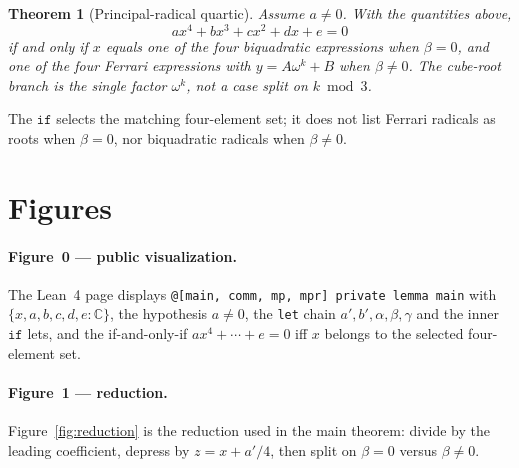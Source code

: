 \documentclass[11pt,a4paper]{article}
\newtheorem{theorem}{Theorem}[section]
\newcommand{\C}{\mathbb{C}}
\begin{document}
\begin{theorem}[Principal-radical quartic]
\label{thm:quartic}
Assume \(a\neq 0\).
With the quantities above,
\[
ax^4+bx^3+cx^2+dx+e=0
\]
if and only if \(x\) equals one of the four biquadratic expressions when \(\beta=0\), and one of the four Ferrari expressions with \(y=A\omega^{k}+B\) when \(\beta\neq 0\).
The cube-root branch is the single factor \(\omega^{k}\), not a case split on \(k\bmod 3\).
\end{theorem}

The \(\mathtt{if}\) selects the matching four-element set; it does not list Ferrari radicals as roots when \(\beta=0\), nor biquadratic radicals when \(\beta\neq 0\).

\section{Figures}
\label{sec:figures}

\paragraph{Figure~0 --- public visualization.}
The Lean~4 page displays \texttt{@[main, comm, mp, mpr] private lemma main} with \(\{x,a,b,c,d,e:\C\}\), the hypothesis \(a\neq 0\), the \texttt{let} chain \(a',b',\alpha,\beta,\gamma\) and the inner \(\mathtt{if}\) lets, and the if-and-only-if
\(ax^4+\cdots+e=0\) iff \(x\) belongs to the selected four-element set.

\paragraph{Figure~1 --- reduction.}
Figure~\ref{fig:reduction} is the reduction used in the main theorem: divide by the leading coefficient, depress by \(z=x+a'/4\), then split on \(\beta=0\) versus \(\beta\neq 0\).
\end{document}
